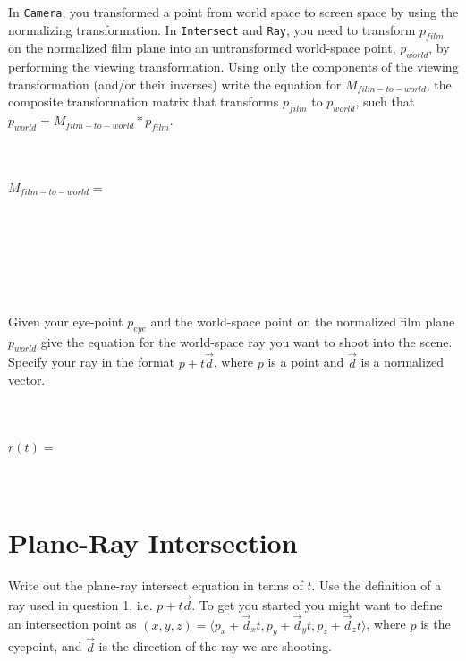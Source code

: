 \documentclass[10pt,twocolumn]{article}
\begin{document}
\begin{framed}
\noindent {\bf [1 point]} In {\tt Camera}, you transformed a point from world space to screen space by using the normalizing transformation. In {\tt Intersect} and {\tt Ray}, you need to transform $p_{film}$ on the normalized film plane into an untransformed world-space point, $p_{world}$, by performing the viewing transformation. Using only the components of the viewing transformation (and/or their inverses) write the equation for $M_{film-to-world}$, the composite transformation matrix that transforms $p_{film}$ to $p_{world}$, such that $p_{world} = M_{film-to-world} * p_{film}$.\\\\\\\\
$M_{film-to-world} =$\\\\\\\\\\\\\\
\end{framed}

\begin{framed}
\noindent {\bf [1 point]} Given your eye-point $p_{eye}$ and the world-space point on the normalized film plane $p_{world}$ give the equation for the world-space ray you want to shoot into the scene. Specify your ray in the format $p + t\vec{d}$, where $p$ is a point and $\vec{d}$ is a normalized vector. \\\\\\\\
$r(t) =$\\\\\\
\end{framed}

\section{Plane-Ray Intersection}

Write out the plane-ray intersect equation in terms of $t$. Use the definition of a ray used in question 1, i.e. $p + t\vec{d}$. To get you started you might want to define
an intersection point as $(x, y, z) = \langle p_x + \vec{d}_xt, p_y + \vec{d}_yt, p_z + \vec{d}_zt\rangle$, where $p$ is the eyepoint, and $\vec{d}$ is the direction of the ray we are shooting. 
\end{document}
